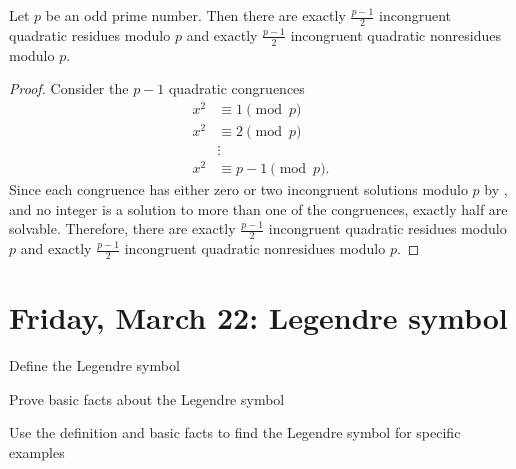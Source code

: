 \documentclass[letterpaper, 11 pt]{ximera}
\theoremstyle{definition}
\begin{document}
\begin{prop*}[Proposition 4.3]\label{prop:number-quad-residues}
	Let $p$ be an odd prime number. Then there are exactly $\frac{p-1}{2}$ incongruent quadratic residues modulo $p$ and exactly $\frac{p-1}{2}$ incongruent quadratic nonresidues modulo $p.$
\end{prop*}
\begin{proof}
	Consider the $p-1$ quadratic congruences
	\begin{align*}
 		x^2&\equiv 1\pmod{p}\\
		x^2&\equiv 2\pmod{p}\\
		&\vdots\\
		x^2&\equiv p-1\pmod{p}.
	\end{align*}
	Since each congruence has either zero or two incongruent solutions modulo $p$ by , and no integer is a solution to more than one of the congruences, exactly half are solvable. Therefore,  there are exactly $\frac{p-1}{2}$ incongruent quadratic residues modulo $p$ and exactly $\frac{p-1}{2}$ incongruent quadratic nonresidues modulo $p.$
\end{proof}

\section{Friday, March 22: Legendre symbol}

\begin{obj}
    \item Define the Legendre symbol
    \item Prove basic facts about the Legendre symbol
    \item Use the definition and basic facts to find the Legendre symbol for specific examples
\end{obj}
\end{document}
